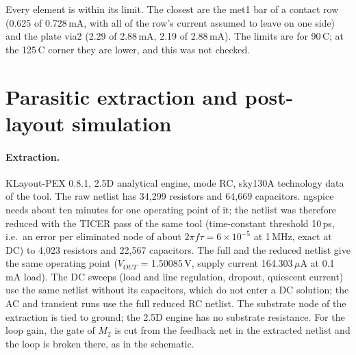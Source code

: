 \documentclass[10pt,a4paper]{article}
\newcommand{\VOUT}{V_{OUT}}
\begin{document}
\noindent Every element is within its limit. The closest are the met1 bar of a contact row (0.625 of 0.728\,mA, with all of the row's current assumed to leave on one side) and the plate via2 (2.29 of 2.88\,mA, 2.19 of 2.88\,mA). The limits are for 90\,\textdegree C; at the 125\,\textdegree C corner they are lower, and this was not checked.

\section{Parasitic extraction and post-layout simulation}

\paragraph{Extraction.} KLayout-PEX 0.8.1, 2.5D analytical engine, mode RC, sky130A technology data of the tool. The raw netlist has 34,299 resistors and 64,669 capacitors. ngspice needs about ten minutes for one operating point of it; the netlist was therefore reduced with the TICER pass of the same tool (time-constant threshold 10\,ps, i.e.\ an error per eliminated node of about $2\pi f\tau = 6\times10^{-5}$ at 1\,MHz, exact at DC) to 4,023 resistors and 22,567 capacitors. The full and the reduced netlist give the same operating point ($\VOUT$ = 1.50085\,V, supply current 164.303\,$\mu$A at 0.1\,mA load). The DC sweeps (load and line regulation, dropout, quiescent current) use the same netlist without its capacitors, which do not enter a DC solution; the AC and transient runs use the full reduced RC netlist. The substrate node of the extraction is tied to ground; the 2.5D engine has no substrate resistance. For the loop gain, the gate of $M_2$ is cut from the feedback net in the extracted netlist and the loop is broken there, as in the schematic.
\end{document}
